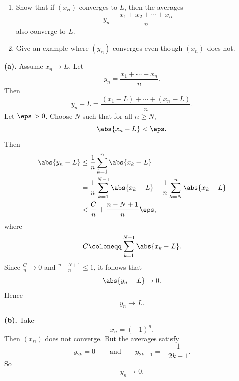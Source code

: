 \begin{problem}{
    \begin{enumerate}[label={(\alph*)}]
\item Show that if $(x_n)$ converges to $L$, then the averages
\[
    y_n=\frac{x_1+x_2+\cdots+x_n}{n}
\]
also converge to $L$.
\item Give an example where $(y_n)$ converges even though $(x_n)$ does not.
    \end{enumerate}
}
    \textbf{(a).}
    Assume $x_n\to L$.
    Let
    \[
        y_n=\frac{x_1+\cdots+x_n}{n}.
    \]
    Then
    \[
        y_n-L=\frac{(x_1-L)+\cdots+(x_n-L)}{n}.
    \]
    Let $\eps>0$.
    Choose $N$ such that for all $n\geq N$,
    \[
        \abs{x_n-L}<\eps.
    \]
    Then
    \begin{align*}
        \abs{y_n-L}
        &\leq \frac1n\sum_{k=1}^n \abs{x_k-L}\\
        &= \frac1n\sum_{k=1}^{N-1}\abs{x_k-L}
        +\frac1n\sum_{k=N}^{n}\abs{x_k-L}\\
        &< \frac{C}{n}+\frac{n-N+1}{n}\eps,
    \end{align*}
    where
    \[
        C\coloneqq \sum_{k=1}^{N-1}\abs{x_k-L}.
    \]
    Since $\frac{C}{n}\to0$ and $\frac{n-N+1}{n}\leq1$, it follows that
    \[
        \abs{y_n-L}\to0.
    \]
    Hence
    \[
        y_n\to L.
    \]

    \textbf{(b).}
    Take
    \[
        x_n=(-1)^n.
    \]
    Then $(x_n)$ does not converge.
    But the averages satisfy
    \[
        y_{2k}=0
        \qquad\text{and}\qquad
        y_{2k+1}=-\frac{1}{2k+1}.
    \]
    So
    \[
        y_n\to0.
    \]
\end{problem}